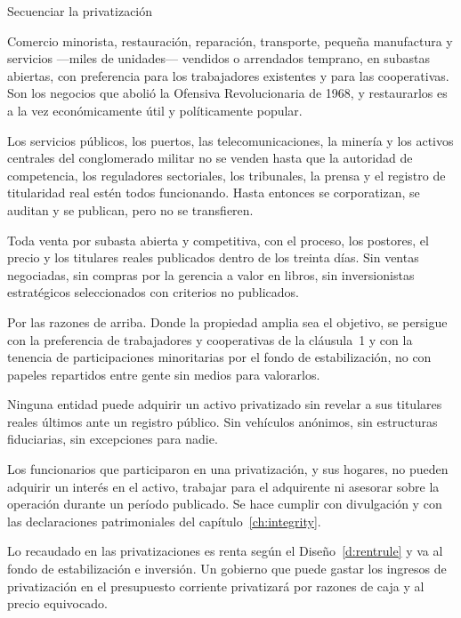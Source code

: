 \begin{design}{Secuenciar la privatización}
\label{d:privat}
\begin{rules}
 Comercio minorista, restauración, reparación, transporte,
pequeña manufactura y servicios ---miles de unidades--- vendidos o arrendados temprano, en
subastas abiertas, con preferencia para los trabajadores existentes y para las cooperativas. Son
los negocios que abolió la Ofensiva Revolucionaria de 1968, y restaurarlos es a la vez
económicamente útil y políticamente popular.

 Los servicios públicos, los puertos, las telecomunicaciones, la
minería y los activos centrales del conglomerado militar no se venden hasta que la autoridad de
competencia, los reguladores sectoriales, los tribunales, la prensa y el registro de titularidad
real estén todos funcionando. Hasta entonces se corporatizan, se auditan y se publican, pero no
se transfieren.

 Toda venta por subasta abierta y competitiva, con el proceso, los
postores, el precio y los titulares reales publicados dentro de los treinta días. Sin ventas
negociadas, sin compras por la gerencia a valor en libros, sin inversionistas estratégicos
seleccionados con criterios no publicados.

 Por las razones de arriba. Donde la propiedad amplia sea el
objetivo, se persigue con la preferencia de trabajadores y cooperativas de la cláusula~1 y con la
tenencia de participaciones minoritarias por el fondo de estabilización, no con papeles
repartidos entre gente sin medios para valorarlos.

 Ninguna entidad puede adquirir un activo privatizado sin revelar a sus
titulares reales últimos ante un registro público. Sin vehículos anónimos, sin estructuras
fiduciarias, sin excepciones para nadie.

 Los funcionarios que participaron en una privatización, y sus
hogares, no pueden adquirir un interés en el activo, trabajar para el adquirente ni asesorar
sobre la operación durante un período publicado. Se hace cumplir con divulgación y con las
declaraciones patrimoniales del capítulo~\ref{ch:integrity}.

 Lo recaudado en las privatizaciones es renta según el
Diseño~\ref{d:rentrule} y va al fondo de estabilización e inversión. Un gobierno que puede gastar
los ingresos de privatización en el presupuesto corriente privatizará por razones de caja y al
precio equivocado.
\end{rules}
\end{design}

